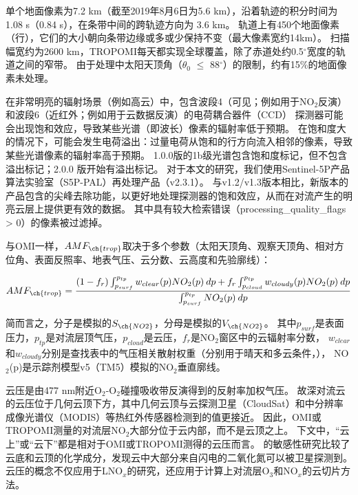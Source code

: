 单个地面像素为7.2 km（截至2019年8月6日为5.6 km），沿着轨迹的积分时间为1.08 s（0.84 s），在条带中间的跨轨迹方向为 3.6 km。
轨道上有450个地面像素（行），它们的大小朝向条带边缘或多或少保持不变（最大像素宽约14km）。
扫描幅宽约为2600 km，TROPOMI每天都实现全球覆盖，除了赤道处约0.5$^{\circ}$宽度的轨道之间的窄带。
由于处理中太阳天顶角（$\theta_0$ $\leq$ 88$^{\circ}$）的限制，约有15\%的地面像素未处理。

在非常明亮的辐射场景（例如高云）中，包含波段4（可见；例如用于NO$_2$反演）和波段6（近红外；例如用于云数据反演）的电荷耦合器件（CCD） 探测器可能会出现饱和效应\citep{Ludewig.2020}，导致某些光谱（即波长）像素的辐射率低于预期。
在饱和度大的情况下，可能会发生电荷溢出：过量电荷从饱和的行方向流入相邻的像素，导致某些光谱像素的辐射率高于预期。
1.0.0版的1b级光谱包含饱和度标记，但不包含溢出标记；2.0.0 版开始有溢出标记\citep{Ludewig.2020}。
对于本文的研究，我们使用Sentinel-5P产品算法实验室（S5P-PAL）再处理产品（v2.3.1）。
与v1.2/v1.3版本相比，新版本的产品包含的尖峰去除功能，以更好地处理探测器的饱和效应，从而在对流产生的明亮云层上提供更有效的数据\citep{Ludewig.2020,VanGeffen.2022}。
其中具有较大检索错误（processing\_quality\_flags > 0）的像素被过滤掉。

与OMI一样，$AMF_{\ch{trop}}$取决于多个参数（太阳天顶角、观察天顶角、相对方位角、表面反照率、地表气压、云分数、云高度和先验廓线）：

\begin{equation} \label{eq:AMF_NO2}
AMF_{\ch{trop}} = \frac{(1-f_r) \int_{p_{surf}}^{p_{tp}} w_{clear}(p) NO_2(p) \: dp + f_r \int_{p_{cloud}}^{p_{tp}} w_{cloudy}(p) NO_2(p) \: dp}{\int_{p_{surf}}^{p_{tp}} NO_2(p) \: dp}
\end{equation}

简而言之，分子是模拟的$S_{\ch{NO2}}$，分母是模拟的$V_{\ch{NO2}}$。
其中$p_{surf}$是表面压力，$p_{tp}$是对流层顶气压，$p_{cloud}$是云压，$f_{r}$是NO$_2$窗区中的云辐射率分数，
$w_{clear}$和$w_{cloudy}$分别是查找表中的气压相关散射权重（分别用于晴天和多云条件，\citet{Lorente.2017}），
NO$_2$(p)是示踪剂模型v5（TM5）模拟的NO$_2$垂直廓线。

云压是由477 nm附近O$_2$-O$_2$碰撞吸收带反演得到的反射率加权气压\citep{Acarreta.2004,Sneep.2008,Stammes.2008}。
故深对流云的云压位于几何云顶下方，其中几何云顶与云探测卫星（CloudSat）和中分辨率成像光谱仪（MODIS）等热红外传感器检测到的值更接近\citep{Vasilkov.2008,Joiner.2012}。
因此，OMI或TROPOMI测量的对流层NO$_2$大部分位于云内部，而不是云顶之上。
下文中，“云上”或“云下”都是相对于OMI或TROPOMI测得的云压而言。
\citet{Beirle.2009}的敏感性研究比较了云底和云顶的化学成分，发现云中大部分来自闪电的二氧化氮可以被卫星探测到。
云压的概念不仅应用于LNO$_x$的研究，还应用于计算上对流层O$_3$和NO$_x$的云切片方法\citep{Ziemke.2009,Choi.2014,Strode.2017,Ziemke.2017,Marais.2018}。


